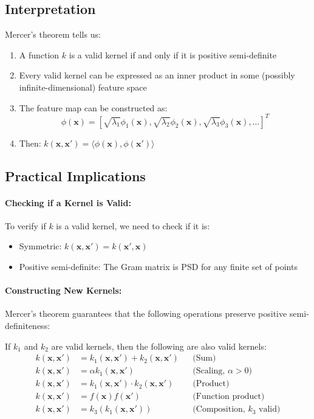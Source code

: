 \documentclass{tufte-handout}
\begin{document}
\subsection{Interpretation}

Mercer's theorem tells us:
\begin{enumerate}
    \item A function $k$ is a valid kernel if and only if it is positive semi-definite
    \item Every valid kernel can be expressed as an inner product in some (possibly infinite-dimensional) feature space
    \item The feature map can be constructed as:
    \begin{equation}
    \phi(\mathbf{x}) = [\sqrt{\lambda_1}\phi_1(\mathbf{x}), \sqrt{\lambda_2}\phi_2(\mathbf{x}), \sqrt{\lambda_3}\phi_3(\mathbf{x}), \ldots]^T
    \end{equation}
    \item Then: $k(\mathbf{x}, \mathbf{x}') = \langle \phi(\mathbf{x}), \phi(\mathbf{x}') \rangle$
\end{enumerate}

\subsection{Practical Implications}

\paragraph{Checking if a Kernel is Valid:}
To verify if $k$ is a valid kernel, we need to check if it is:
\begin{itemize}
    \item Symmetric: $k(\mathbf{x}, \mathbf{x}') = k(\mathbf{x}', \mathbf{x})$
    \item Positive semi-definite: The Gram matrix is PSD for any finite set of points
\end{itemize}

\paragraph{Constructing New Kernels:}
Mercer's theorem guarantees that the following operations preserve positive semi-definiteness:


If $k_1$ and $k_2$ are valid kernels, then the following are also valid kernels:
\begin{align}
k(\mathbf{x}, \mathbf{x}') &= k_1(\mathbf{x}, \mathbf{x}') + k_2(\mathbf{x}, \mathbf{x}') && \text{(Sum)} \\
k(\mathbf{x}, \mathbf{x}') &= \alpha k_1(\mathbf{x}, \mathbf{x}') && \text{(Scaling, } \alpha > 0\text{)} \\
k(\mathbf{x}, \mathbf{x}') &= k_1(\mathbf{x}, \mathbf{x}') \cdot k_2(\mathbf{x}, \mathbf{x}') && \text{(Product)} \\
k(\mathbf{x}, \mathbf{x}') &= f(\mathbf{x})f(\mathbf{x}') && \text{(Function product)} \\
k(\mathbf{x}, \mathbf{x}') &= k_3(k_1(\mathbf{x}, \mathbf{x}')) && \text{(Composition, } k_3 \text{ valid)}
\end{align}
\end{document}
